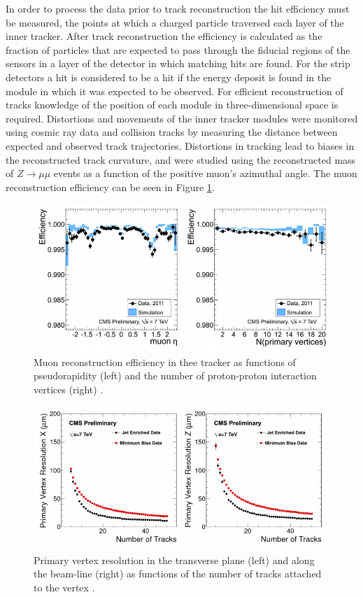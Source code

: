 In order to process the data prior to track reconstruction the hit efficiency must be measured, the points at which a charged particle traversed each layer of the inner tracker. After track reconstruction the efficiency is calculated as the fraction of particles that are expected to pass through the fiducial regions of the sensors in a layer of the detector in which matching hits are found. For the strip detectors a hit is considered to be a hit if the energy deposit is found in the module in which it was expected to be observed. For efficient reconstruction of tracks knowledge of the position of each module in three-dimensional space is required. Distortions and movements of the inner tracker modules were monitored using cosmic ray data and collision tracks by measuring the distance between expected and observed track trajectories. Distortions in tracking lead to biases in the reconstructed track curvature, and were studied using the reconstructed mass of $Z \to \mu\mu$ events as a function of the positive muon's azimuthal angle. The muon reconstruction efficiency can be seen in Figure \ref{fig-MuonReconstructionEfficiency}.

\begin{figure} \label{fig-MuonReconstructionEfficiency}
\includegraphics[width=\textwidth]{Figures/MuonReconstructionEfficiency.png}
\caption{Muon reconstruction efficiency in thee tracker as functions of pseudorapidity (left) and the number
of proton-proton interaction vertices (right) \cite{TrackingResults}.}
\end{figure}

\begin{figure} \label{fig-PVResolution}
\includegraphics[width=\textwidth]{Figures/PVResolution.png}
\caption{Primary vertex resolution in the transverse plane (left) and along the beam-line (right) as functions
of the number of tracks attached to the vertex \cite{TrackingResults}.}
\end{figure}

